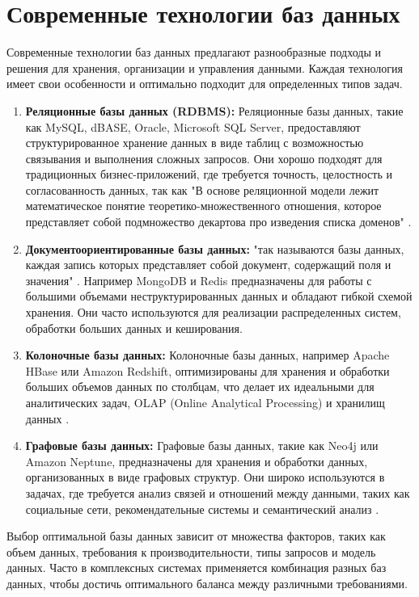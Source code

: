 \section{Современные технологии баз данных}
Современные технологии баз данных предлагают разнообразные подходы и решения для хранения, организации и управления данными. 
Каждая технология имеет свои особенности и оптимально подходит для определенных типов задач.

\begin{enumerate}
    \item \textbf{Реляционные базы данных (RDBMS):} Реляционные базы данных, 
    такие как MySQL, dBASE, Oracle, Microsoft SQL Server, 
    предоставляют структурированное хранение данных в виде таблиц с 
    возможностью связывания и выполнения сложных запросов. 
    Они хорошо подходят для традиционных бизнес-приложений, 
    где требуется точность, целостность и согласованность данных, так как
    "В основе реляционной модели лежит математическое понятие теоретико-множественного отношения, 
    которое представляет собой подмножество декартова про изведения списка доменов" \cite[114]{DatabaseGuide}.
    \item \textbf{Документоориентированные базы данных:} "так называются базы данных, каждая запись которых 
    представляет собой документ, содержащий поля и значения" \cite{SqlNOSql}.
    Например MongoDB и Redis предназначены для работы с большими объемами неструктурированных 
    данных и обладают гибкой схемой хранения. 
    Они часто используются для реализации распределенных систем, 
    обработки больших данных и кеширования.
    \item \textbf{Колоночные базы данных:} Колоночные базы данных, например 
    Apache HBase или Amazon Redshift, 
    оптимизированы для хранения и обработки больших объемов данных по столбцам, 
    что делает их идеальными для аналитических задач, 
    OLAP (Online Analytical Processing) и хранилищ данных \cite{SqlNOSql}. 
    \item \textbf{Графовые базы данных:} Графовые базы данных, такие как Neo4j или Amazon Neptune, 
    предназначены для хранения и обработки данных, организованных в виде графовых структур. 
    Они широко используются в задачах, где требуется анализ связей и отношений между данными, 
    таких как социальные сети, рекомендательные системы и семантический анализ \cite{SqlNOSql}.
\end{enumerate}

Выбор оптимальной базы данных зависит от множества факторов, 
таких как объем данных, требования к производительности, типы запросов и модель данных. 
Часто в комплексных системах применяется комбинация разных баз данных, 
чтобы достичь оптимального баланса между различными требованиями.

